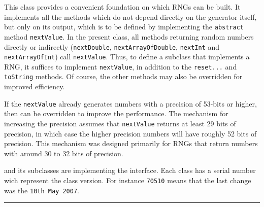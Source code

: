 
This class provides a convenient foundation on which RNGs can
be built. It implements all the methods which do not depend directly on
the generator itself, but only on its output, which is to be defined
by implementing the \texttt{abstract} method \texttt{nextValue}. In the present 
class, all methods returning random numbers directly or indirectly 
(\texttt{nextDouble}, \texttt{nextArrayOfDouble}, \texttt{nextInt} and
 \texttt{nextArrayOfInt}) call \texttt{nextValue}.  Thus, to define a subclass 
that implements a RNG, it suffices to implement \texttt{nextValue}, in addition
 to the \texttt{reset...} and \texttt{toString} methods.
Of course, the other methods may also be overridden for improved efficiency.

If the \texttt{nextValue} already generates numbers with a precision of
 53-bits or higher, then  can be overridden to improve 
the performance. The mechanism for increasing the precision assumes that
 \texttt{nextValue} returns at least 29 bits of precision, in which case 
the higher precision numbers will have roughly 52 bits of precision.
This mechanism was designed primarily for RNGs that return numbers with 
around 30 to 32 bits of precision.

 and its subclasses are implementing the  interface.
Each class has a serial number wich represent the class version. 
For instance \texttt{70510} means that the last change was the \texttt{10th May 2007}.


\bigskip\hrule

